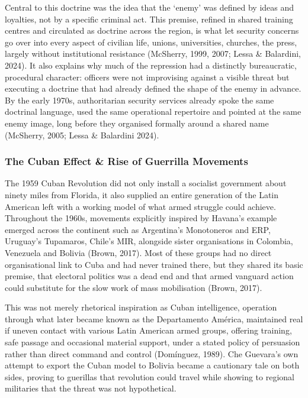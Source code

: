 Central to this doctrine was the idea that the ‘enemy’ was defined by ideas and loyalties, not by a specific criminal act. This premise, refined in shared training centres and circulated as doctrine across the region, is what let security concerns go over into every aspect of civilian life, unions, universities, churches, the press, largely without institutional resistance (McSherry, 1999, 2007; Lessa \& Balardini, 2024). It also explains why much of the repression  had a distinctly bureaucratic, procedural character: officers were not improvising against a visible threat but executing a doctrine that had already defined the shape of the enemy in advance. By the early 1970s, authoritarian security services already spoke the same doctrinal language, used the same operational repertoire and pointed at the same enemy image, long before they organised formally around a shared name (McSherry, 2005; Lessa \& Balardini 2024).

\subsubsection{The Cuban Effect \& Rise of Guerrilla Movements}

The 1959 Cuban Revolution did not only install a socialist government about ninety miles from Florida, it also supplied an entire generation of the Latin American left with a working model of what armed struggle could achieve. Throughout the 1960s, movements explicitly inspired by Havana’s example emerged across the continent such as Argentina’s Monotoneros and ERP, Uruguay’s Tupamaros, Chile’s MIR, alongside sister organisations in Colombia, Venezuela and Bolivia (Brown, 2017). Most of these groups had no direct organisational link to Cuba and had never trained there, but they shared its basic premise, that electoral politics was a dead end and that armed vanguard action could substitute for the slow work of mass mobilisation (Brown, 2017).

This was not merely rhetorical inspiration as Cuban intelligence, operation through what later became known as the Departamento América, maintained real if uneven contact with various Latin American armed groups, offering training, safe passage and occasional material support, under a stated policy of persuasion rather than direct command and control (Domínguez, 1989). Che Guevara’s own attempt to export the Cuban model to Bolivia became a cautionary tale on both sides, proving to guerillas that revolution could travel while showing to regional militaries that the threat was not hypothetical.

